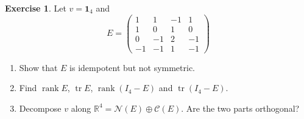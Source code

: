 \documentclass[12pt]{article}
\newcommand{\R}{\mathbb R}
\newcommand{\one}{\mathbf 1}
\DeclareMathOperator{\tr}{tr}
\DeclareMathOperator{\rank}{rank}
\theoremstyle{definition}
\newtheorem{exercise}{Exercise}
\begin{document}
\begin{exercise}\label{r6-ex-idempotent-drill}
Let \(v=\one_4\) and
\[
E=\begin{pmatrix}1&1&-1&1\\1&0&1&0\\0&-1&2&-1\\-1&-1&1&-1\end{pmatrix}
\]
\begin{enumerate}
\item Show that \(E\) is idempotent but not symmetric.
\item Find \(\rank E\), \(\tr E\), \(\rank(I_4-E)\) and \(\tr(I_4-E)\).
\item Decompose \(v\) along \(\R^4=\mathcal N(E)\oplus\mathcal C(E)\). Are the two parts orthogonal?
\end{enumerate}
\end{exercise}
\end{document}
